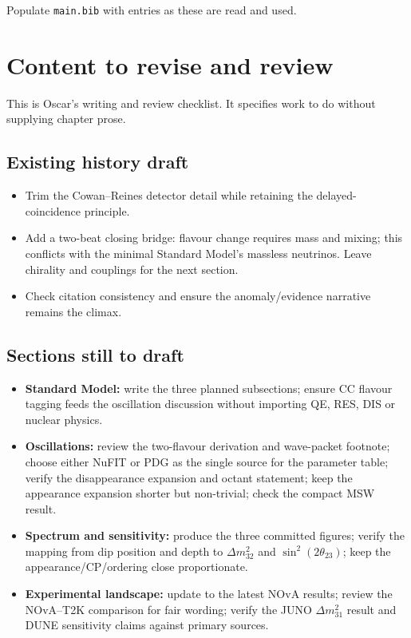 \documentclass[11pt]{article}
\begin{document}
Populate \texttt{main.bib} with entries as these are read and used.

\section{Content to revise and review}

This is Oscar's writing and review checklist. It specifies work to do without supplying chapter
prose.

\subsection{Existing history draft}
\begin{itemize}
    \item Trim the Cowan--Reines detector detail while retaining the delayed-coincidence principle.
    \item Add a two-beat closing bridge: flavour change requires mass and mixing; this conflicts
    with the minimal Standard Model's massless neutrinos. Leave chirality and couplings for the
    next section.
    \item Check citation consistency and ensure the anomaly/evidence narrative remains the climax.
\end{itemize}

\subsection{Sections still to draft}
\begin{itemize}
    \item \textbf{Standard Model:} write the three planned subsections; ensure CC flavour tagging
    feeds the oscillation discussion without importing QE, RES, DIS or nuclear physics.
    \item \textbf{Oscillations:} review the two-flavour derivation and wave-packet footnote; choose
    either NuFIT or PDG as the single source for the parameter table; verify the disappearance
    expansion and octant statement; keep the appearance expansion shorter but non-trivial; check
    the compact MSW result.
    \item \textbf{Spectrum and sensitivity:} produce the three committed figures; verify the
    mapping from dip position and depth to $\Delta m^{2}_{32}$ and
    $\sin^{2}(2\theta_{23})$; keep the appearance/CP/ordering close proportionate.
    \item \textbf{Experimental landscape:} update to the latest NOvA results; review the
    NOvA--T2K comparison for fair wording; verify the JUNO $\Delta m^{2}_{31}$ result and DUNE
    sensitivity claims against primary sources.
\end{itemize}
\end{document}
